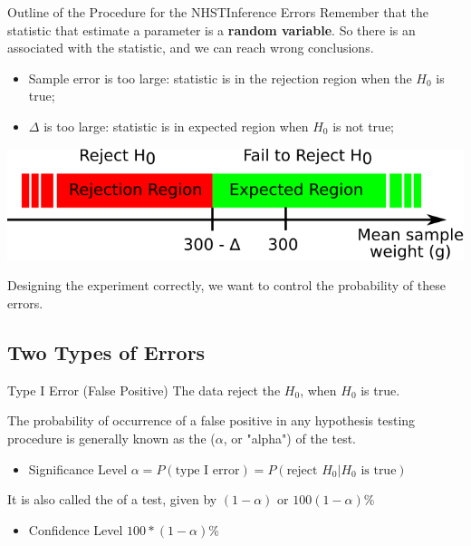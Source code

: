 \begin{frame}{Outline of the Procedure for the NHST}{Inference Errors}
  Remember that the statistic that estimate a parameter is a {\bf random variable}. So there is an  associated with the statistic, and we can reach \alert{wrong conclusions}.\bigskip

  \begin{itemize}
    \item Sample error is too large: statistic is in the rejection region when the $H_0$ is true;

    \item $\Delta$ is too large: statistic is in expected region when $H_0$ is not true;
  \end{itemize}\bigskip
  \begin{center}
    \includegraphics[width=.5\textwidth]{../img/critical_region}
  \end{center}

  Designing the experiment correctly, we want to control the probability of these errors.
\end{frame}

\subsection{Two Types of Errors}

\begin{frame}[t]{Type I Error (False Positive)}
{The data reject the $H_0$, when $H_0$ is true.}

  The probability of occurrence of a false positive in any hypothesis testing procedure is generally known as the  ($\alpha$, or "alpha") of the test.\bigskip
    \begin{itemize}
      \item Significance Level $\alpha = P(\text{type I error}) = P(\text{reject }H_0|H_0\text{ is true})$
    \end{itemize}\vfill

  It is also called the  of a test, given by $(1-\alpha)$ or $100(1-\alpha)$\%\bigskip

  \begin{itemize}
    \item Confidence Level $100*(1-\alpha)$\%
  \end{itemize}
\end{frame}

